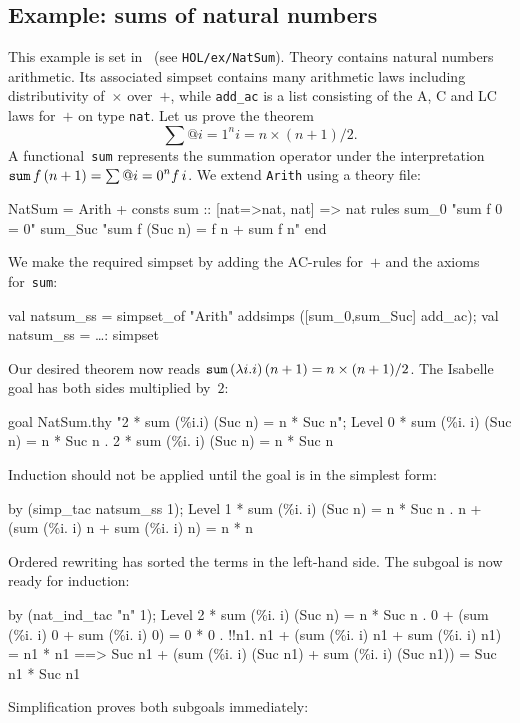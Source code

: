 \subsection{Example: sums of natural numbers}
This example is set in \HOL\ (see \texttt{HOL/ex/NatSum}).  Theory
 contains natural numbers arithmetic.  Its associated
simpset contains many arithmetic laws including distributivity
of~$\times$ over~$+$, while {\tt add_ac} is a list consisting of the
A, C and LC laws for~$+$ on type \texttt{nat}.  Let us prove the
theorem
\[ \sum@{i=1}^n i = n\times(n+1)/2. \]
%
A functional~{\tt sum} represents the summation operator under the
interpretation ${\tt sum} \, f \, (n + 1) = \sum@{i=0}^n f\,i$.  We
extend {\tt Arith} using a theory file:
\begin{ttbox}
NatSum = Arith +
consts sum     :: [nat=>nat, nat] => nat
rules  sum_0      "sum f 0 = 0"
       sum_Suc    "sum f (Suc n) = f n + sum f n"
end
\end{ttbox}
We make the required simpset by adding the AC-rules for~$+$ and the
axioms for~{\tt sum}:
\begin{ttbox}
val natsum_ss = simpset_of "Arith" addsimps ([sum_0,sum_Suc] \at add_ac);
{\out val natsum_ss = \ldots : simpset}
\end{ttbox}
Our desired theorem now reads ${\tt sum} \, (\lambda i.i) \, (n+1) =
n\times(n+1)/2$.  The Isabelle goal has both sides multiplied by~$2$:
\begin{ttbox}
goal NatSum.thy "2 * sum (\%i.i) (Suc n) = n * Suc n";
{\out Level 0}
{ * sum (\%i. i) (Suc n) = n * Suc n}
{. 2 * sum (\%i. i) (Suc n) = n * Suc n}
\end{ttbox}
Induction should not be applied until the goal is in the simplest
form:
\begin{ttbox}
by (simp_tac natsum_ss 1);
{\out Level 1}
{ * sum (\%i. i) (Suc n) = n * Suc n}
{. n + (sum (\%i. i) n + sum (\%i. i) n) = n * n}
\end{ttbox}
Ordered rewriting has sorted the terms in the left-hand side.  The
subgoal is now ready for induction:
\begin{ttbox}
by (nat_ind_tac "n" 1);
{\out Level 2}
{ * sum (\%i. i) (Suc n) = n * Suc n}
{. 0 + (sum (\%i. i) 0 + sum (\%i. i) 0) = 0 * 0}
\ttbreak
{. !!n1. n1 + (sum (\%i. i) n1 + sum (\%i. i) n1) = n1 * n1}
{\out           ==> Suc n1 + (sum (\%i. i) (Suc n1) + sum (\%i. i) (Suc n1)) =}
{\out               Suc n1 * Suc n1}
\end{ttbox}
Simplification proves both subgoals immediately:
